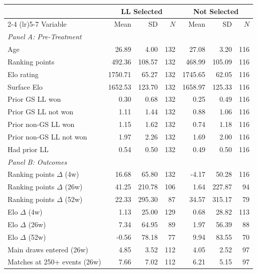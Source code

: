 \begin{tabular}{p{4cm} rrr rrr}
\toprule
 & \multicolumn{3}{c}{LL Selected} & \multicolumn{3}{c}{Not Selected} \\
\cmidrule(lr){2-4} \cmidrule(lr){5-7}
Variable & Mean & SD & $N$ & Mean & SD & $N$ \\
\midrule
\multicolumn{7}{l}{\textit{Panel A: Pre-Treatment}} \\
\quad Age & 26.89 & 4.00 & 132 & 27.08 & 3.20 & 116 \\
\quad Ranking points & 492.36 & 108.57 & 132 & 468.99 & 105.09 & 116 \\
\quad Elo rating & 1750.71 & 65.27 & 132 & 1745.65 & 62.05 & 116 \\
\quad Surface Elo & 1652.53 & 123.70 & 132 & 1658.97 & 125.33 & 116 \\
\quad Prior GS LL won & 0.30 & 0.68 & 132 & 0.25 & 0.49 & 116 \\
\quad Prior GS LL not won & 1.11 & 1.44 & 132 & 0.88 & 1.06 & 116 \\
\quad Prior non-GS LL won & 1.15 & 1.62 & 132 & 0.74 & 1.18 & 116 \\
\quad Prior non-GS LL not won & 1.97 & 2.26 & 132 & 1.69 & 2.00 & 116 \\
\quad Had prior LL & 0.54 & 0.50 & 132 & 0.49 & 0.50 & 116 \\
\midrule
\multicolumn{7}{l}{\textit{Panel B: Outcomes}} \\
\quad Ranking points $\Delta$ (4w) & 16.68 & 65.80 & 132 & -4.17 & 50.28 & 116 \\
\quad Ranking points $\Delta$ (26w) & 41.25 & 210.78 & 106 & 1.64 & 227.87 & 94 \\
\quad Ranking points $\Delta$ (52w) & 22.33 & 295.30 & 87 & 34.57 & 315.17 & 79 \\
\quad Elo $\Delta$ (4w) & 1.13 & 25.00 & 129 & 0.68 & 28.82 & 113 \\
\quad Elo $\Delta$ (26w) & 7.34 & 64.95 & 89 & 1.97 & 56.39 & 88 \\
\quad Elo $\Delta$ (52w) & -0.56 & 78.18 & 77 & 9.94 & 83.55 & 70 \\
\quad Main draws entered (26w) & 4.85 & 3.52 & 112 & 4.05 & 2.52 & 97 \\
\quad Matches at 250+ events (26w) & 7.66 & 7.02 & 112 & 6.21 & 5.15 & 97 \\
\bottomrule
\end{tabular}
